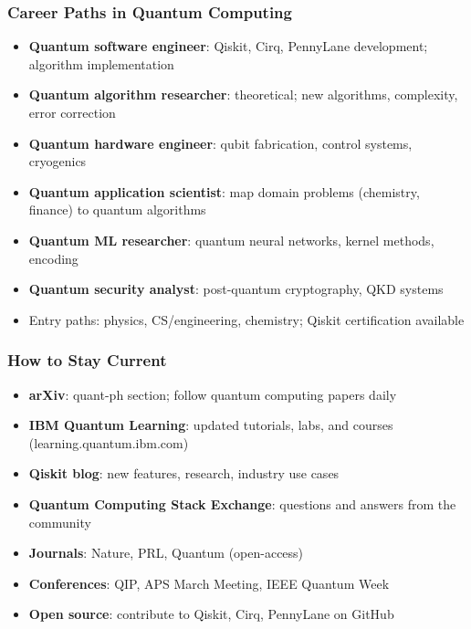 \begin{frame}[fragile]\frametitle{Career Paths in Quantum Computing}
\begin{itemize}
\item \textbf{Quantum software engineer}: Qiskit, Cirq, PennyLane development; algorithm implementation
\item \textbf{Quantum algorithm researcher}: theoretical; new algorithms, complexity, error correction
\item \textbf{Quantum hardware engineer}: qubit fabrication, control systems, cryogenics
\item \textbf{Quantum application scientist}: map domain problems (chemistry, finance) to quantum algorithms
\item \textbf{Quantum ML researcher}: quantum neural networks, kernel methods, encoding
\item \textbf{Quantum security analyst}: post-quantum cryptography, QKD systems
\item Entry paths: physics, CS/engineering, chemistry; Qiskit certification available
\end{itemize}
\end{frame}

\begin{frame}[fragile]\frametitle{How to Stay Current}
\begin{itemize}
\item \textbf{arXiv}: quant-ph section; follow quantum computing papers daily
\item \textbf{IBM Quantum Learning}: updated tutorials, labs, and courses (learning.quantum.ibm.com)
\item \textbf{Qiskit blog}: new features, research, industry use cases
\item \textbf{Quantum Computing Stack Exchange}: questions and answers from the community
\item \textbf{Journals}: Nature, PRL, Quantum (open-access)
\item \textbf{Conferences}: QIP, APS March Meeting, IEEE Quantum Week
\item \textbf{Open source}: contribute to Qiskit, Cirq, PennyLane on GitHub
\end{itemize}
\end{frame}

